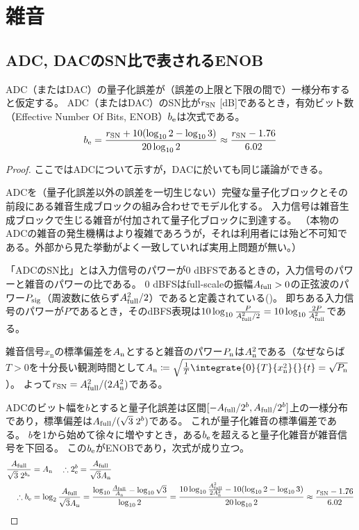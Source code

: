 \part{雑音}
    \chapter{ADC, DACのSN比で表されるENOB}
        \begin{shadebox}
            ADC（またはDAC）の量子化誤差が（誤差の上限と下限の間で）一様分布すると仮定する。
            ADC（またはDAC）のSN比が$r_\mathrm{SN}$ [dB]であるとき，有効ビット数（Effective Number Of Bits, ENOB）$b_\mathrm{e}$は次式である。
            \[ b_\mathrm{e} = \frac{r_\mathrm{SN} + 10(\log_{10} 2 - \log_{10} 3)}{20\log_{10} 2} \approx \frac{r_\mathrm{SN} - 1.76}{6.02} \]
        \end{shadebox}
        \begin{proof}
            ここではADCについて示すが，DACに於いても同じ議論ができる。\par
            ADCを（量子化誤差以外の誤差を一切生じない）完璧な量子化ブロックとその前段にある雑音生成ブロックの組み合わせでモデル化する。
            入力信号は雑音生成ブロックで生じる雑音が付加されて量子化ブロックに到達する。
            （本物のADCの雑音の発生機構はより複雑であろうが，それは利用者には殆ど不可知である。外部から見た挙動がよく一致していれば実用上問題が無い。）
            \par
            「ADCのSN比」とは入力信号のパワーが0 dBFSであるときの，入力信号のパワーと雑音のパワーの比である。
            0 dBFSはfull-scaleの振幅$A_\mathrm{full}>0$の正弦波のパワー$P_\mathrm{sig}$（周波数に依らず$A_\mathrm{full}^2/2$）であると定義されている(\cite{dBFS})。
            即ちある入力信号のパワーが$P$であるとき，そのdBFS表現は$10\log_{10} \frac{P}{A_\mathrm{full}^2/2} = 10\log_{10} \frac{2P}{A_\mathrm{full}^2}$である。
            \par
            雑音信号$x_\mathrm{n}$の標準偏差を$A_\mathrm{n}$とすると雑音のパワー$P_\mathrm{n}$は$A_\mathrm{n}^2$である（なぜならば$T>0$を十分長い観測時間として$\An\coloneq\sqrt{\frac{1}{T}\integrate{0}{T}{x_\mathrm{n}^2}{}{t}} = \sqrt{\Pn}$）。
            よって$r_\mathrm{SN} = A_\mathrm{full}^2/(2A_\mathrm{n}^2)$である。
            \par
            ADCのビット幅を$b$とすると量子化誤差は区間$[-A_\mathrm{full}/2^b,A_\mathrm{full}/2^b]$上の一様分布であり，標準偏差は$A_\mathrm{full}/(\sqrt{3}\;2^b)$である。
            これが量子化雑音の標準偏差である。
            $b$を1から始めて徐々に増やすとき，ある$b_\mathrm{e}$を超えると量子化雑音が雑音信号を下回る。
            この$b_\mathrm{e}$がENOBであり，次式が成り立つ。
            \begin{align*}
                \frac{A_\mathrm{full}}{\sqrt{3}\;2^{b_\mathrm{e}}} &= A_\mathrm{n} \quad \therefore 2^b_\mathrm{e} = \frac{A_\mathrm{full}}{\sqrt{3}A_\mathrm{n}} \\
                \therefore b_\mathrm{e} &= \log_2 \frac{A_\mathrm{full}}{\sqrt{3}A_\mathrm{n}} = \frac{\log_{10}\frac{A_\mathrm{full}}{A_\mathrm{n}} - \log_{10}\sqrt{3}}{\log_{10} 2} = \frac{10\log_{10}\frac{A_\mathrm{full}^2}{2A_\mathrm{n}^2} - 10(\log_{10}2 - \log_{10}3)}{20\log_{10} 2} \approx \frac{r_\mathrm{SN} - 1.76}{6.02}
            \end{align*}
        \end{proof}